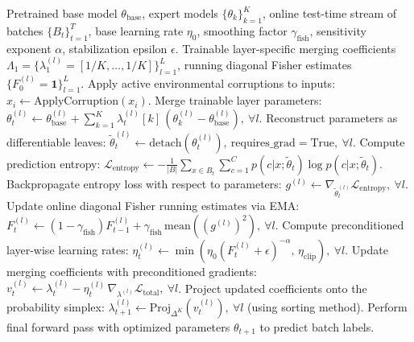 \documentclass{article}
\theoremstyle{plain}
\theoremstyle{definition}
\begin{document}
\begin{algorithm}[tb]
\caption{Active Online Fisher Estimation for Test-Time Model Merging (AO-TTMM)}
\label{alg:aottmm}
\begin{algorithmic}[1]
    Pretrained base model $\theta_{\text{base}}$, expert models $\{\theta_k\}_{k=1}^K$, online test-time stream of batches $\{B_t\}_{t=1}^T$, base learning rate $\eta_0$, smoothing factor $\gamma_{\text{fish}}$, sensitivity exponent $\alpha$, stabilization epsilon $\epsilon$.
    Trainable layer-specific merging coefficients $\Lambda_1 = \{\lambda_1^{(l)} = [1/K, \dots, 1/K]\}_{l=1}^L$, running diagonal Fisher estimates $\{F_0^{(l)} = \mathbf{1}\}_{l=1}^L$.
       \STATE Apply active environmental corruptions to inputs: $x_i \gets \text{ApplyCorruption}(x_i)$.
       \STATE Merge trainable layer parameters: $\theta_t^{(l)} \gets \theta_{\text{base}}^{(l)} + \sum_{k=1}^K \lambda_t^{(l)}[k] \, (\theta_k^{(l)} - \theta_{\text{base}}^{(l)}), \ \forall l$.
       \STATE Reconstruct parameters as differentiable leaves: $\tilde{\theta}_t^{(l)} \gets \text{detach}(\theta_t^{(l)}), \ \text{requires\_grad}=\text{True}, \ \forall l$.
       \STATE Compute prediction entropy: $\mathcal{L}_{\text{entropy}} \gets - \frac{1}{|B|} \sum_{x \in B_t} \sum_{c=1}^C p(c|x; \tilde{\theta}_t) \log p(c|x; \tilde{\theta}_t)$.
       \STATE Backpropagate entropy loss with respect to parameters: $g^{(l)} \gets \nabla_{\tilde{\theta}_t^{(l)}} \mathcal{L}_{\text{entropy}}, \ \forall l$.
       \STATE Update online diagonal Fisher running estimates via EMA: $F_t^{(l)} \gets (1 - \gamma_{\text{fish}}) F_{t-1}^{(l)} + \gamma_{\text{fish}} \, \text{mean}\left( (g^{(l)})^2 \right), \ \forall l$.
       \STATE Compute preconditioned layer-wise learning rates: $\eta_t^{(l)} \gets \min\left( \eta_0 \left( F_t^{(l)} + \epsilon \right)^{-\alpha}, \, \eta_{\text{clip}} \right), \ \forall l$.
       \STATE Update merging coefficients with preconditioned gradients: $v_t^{(l)} \gets \lambda_t^{(l)} - \eta_t^{(l)} \, \nabla_{\lambda^{(l)}} \mathcal{L}_{\text{total}}, \ \forall l$.
       \STATE Project updated coefficients onto the probability simplex: $\lambda_{t+1}^{(l)} \gets \text{Proj}_{\Delta^K}(v_t^{(l)}), \ \forall l$ (using sorting method).
       \STATE Perform final forward pass with optimized parameters $\theta_{t+1}$ to predict batch labels.
   \ENDFOR
\end{algorithmic}
\end{algorithm}
\end{document}
